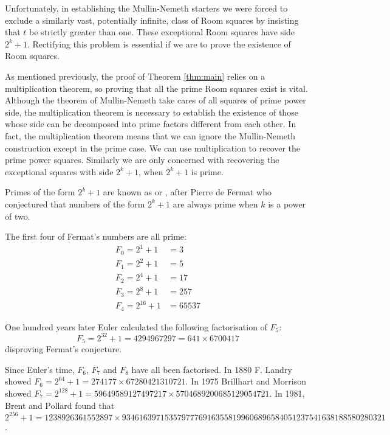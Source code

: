 Unfortunately, in establishing the Mullin-Nemeth starters we were forced to exclude a similarly vast, potentially infinite, class of Room squares by insisting that $t$ be strictly greater than one.
These exceptional Room squares have side $2^k + 1$.
Rectifying this problem is essential if we are to prove the existence of Room squares.

As mentioned previously, the proof of Theorem \ref{thm:main} relies on a multiplication theorem, so proving that all the prime Room squares exist is vital.
Although the theorem of Mullin-Nemeth take cares of all squares of prime power side, the multiplication theorem is necessary to establish the existence of those whose side can be decomposed into prime factors different from each other.
In fact, the multiplication theorem means that we can ignore the Mullin-Nemeth construction except in the prime case.
We can use multiplication to recover the prime power squares.
Similarly we are only concerned with recovering the exceptional squares with side $2^k + 1$, when $2^k + 1$ is prime.

Primes of the form $2^k + 1$ are known as  or , after Pierre de Fermat who conjectured that numbers of the form $2^k + 1$ are always prime when $k$ is a power of two.

The first four of Fermat’s numbers are all prime:
\begin{align*}
  F_0 = 2^1 + 1 &= 3 \\
  F_1 = 2^2 + 1 &= 5 \\
  F_2 = 2^4 + 1 &= 17 \\
  F_3 = 2^8 + 1 &= 257 \\
  F_4 = 2^{16} + 1 &= 65537
\end{align*}

One hundred years later Euler calculated the following factorisation of $F_{5}$:
\begin{equation*}
F_5 = 2^{32}+1 = 4294967297 = 641\times 6700417
\end{equation*}
disproving Fermat's conjecture.

Since Euler’s time, $F_6$, $F_7$ and $F_8$ have all been factorised.
In 1880 F. Landry showed $F_6 = 2^{64} + 1 = 274177 \times 67280421310721$.
In 1975 Brillhart and Morrison showed $F_7 = 2^{128} + 1 = 59649589127497217 \times 5704689200685129054721$.
In 1981, Brent and Pollard found that $2^{256} + 1 = 1238926361552897 \times 93461639715357977769163558199606896584051237541638188580280321$.

